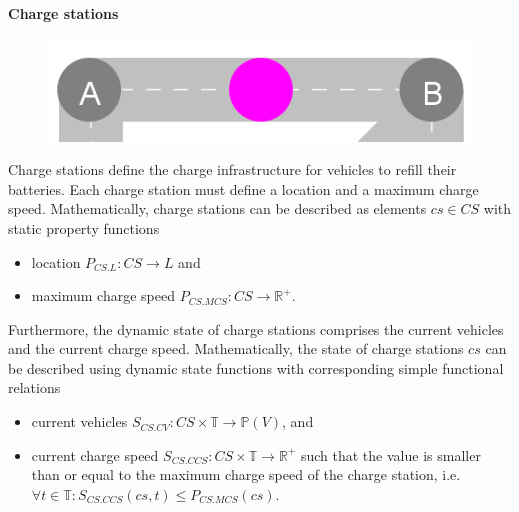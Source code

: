 \documentclass[graybox]{svmult}
\begin{document}

\paragraph{Charge stations}
\begin{figure}
	\begin{center}
		\includegraphics[scale=0.33]{../../concepts/charge-station.png}
\end{center}
\end{figure}
Charge stations define the charge infrastructure for vehicles to refill their batteries.
Each charge station must define a location and a maximum charge speed.
Mathematically, charge stations can be described as elements $cs \in CS$ with static property functions
\begin{itemize}
	\item location $P_{CS.L}: CS \rightarrow L$ and
	\item maximum charge speed $P_{CS.MCS}: CS \rightarrow \mathbb{R}^+$.
\end{itemize}
Furthermore, the dynamic state of charge stations comprises the current vehicles and the current charge speed.
Mathematically, the state of charge stations $cs$ can be described using dynamic state functions with corresponding simple functional relations
\begin{itemize}
	\item current vehicles $S_{CS.CV}: CS \times \mathbb{T} \rightarrow \mathbb{P}(V)$, and
	\item current charge speed $S_{CS.CCS}: CS \times \mathbb{T} \rightarrow \mathbb{R}^+$ such that the value is smaller than or equal to the maximum charge speed of the charge station, i.e.\ $\forall t \in \mathbb{T}: S_{CS.CCS}(cs,t) \leq P_{CS.MCS}(cs)$.
\end{itemize}

\end{document}
